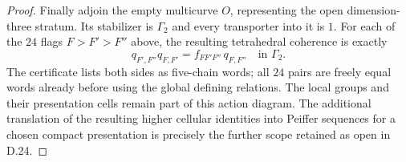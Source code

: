 \begin{proof}
Finally adjoin the empty multicurve $O$, representing
the open dimension-three stratum.  Its stabilizer is
$\Gamma_2$ and every transporter into it is $1$.
For each of the $24$ flags $F>F'>F''$ above, the
resulting tetrahedral coherence is exactly
\[
 q_{F',F''}q_{F,F'}
        =f_{FF'F''}\,q_{F,F''}\quad\text{in }\Gamma_2.       \tag{D.21}
\]
The certificate lists both sides as five-chain words;
all $24$ pairs are freely equal words already before
using the global defining relations.  The local groups
and their presentation cells remain part of this action
diagram.  The additional translation of the resulting
higher cellular identities into Peiffer sequences for a
chosen compact presentation is precisely the further
scope retained as open in D.24.
\end{proof}
